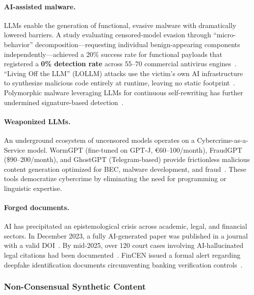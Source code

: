 \paragraph{AI-assisted malware.}
LLMs enable the generation of functional, evasive malware with dramatically lowered barriers. A study evaluating censored-model evasion through ``micro-behavior'' decomposition---requesting individual benign-appearing components independently---achieved a 20\% success rate for functional payloads that registered a \textbf{0\% detection rate} across 55--70 commercial antivirus engines~\cite{mdpi2025malware}. ``Living Off the LLM'' (LOLLM) attacks use the victim's own AI infrastructure to synthesize malicious code entirely at runtime, leaving no static footprint~\cite{lollm2025}. Polymorphic malware leveraging LLMs for continuous self-rewriting has further undermined signature-based detection~\cite{crowdstrike2025ransomware}.

\paragraph{Weaponized LLMs.}
An underground ecosystem of uncensored models operates on a Cybercrime-as-a-Service model. WormGPT (fine-tuned on GPT-J, \euro60--100/month), FraudGPT (\$90--200/month), and GhostGPT (Telegram-based) provide frictionless malicious content generation optimized for BEC, malware development, and fraud~\cite{levelblue2023wormgpt,elpaccto2026}. These tools democratize cybercrime by eliminating the need for programming or linguistic expertise.

\paragraph{Forged documents.}
AI has precipitated an epistemological crisis across academic, legal, and financial sectors. In December 2023, a fully AI-generated paper was published in a journal with a valid DOI~\cite{pmc2025fakepaper}. By mid-2025, over 120 court cases involving AI-hallucinated legal citations had been documented~\cite{mashable2025aihallucinations}. FinCEN issued a formal alert regarding deepfake identification documents circumventing banking verification controls~\cite{thomsonreuters2025fraud}.


\subsubsection{Non-Consensual Synthetic Content}
\label{sec:threat-ncii}

